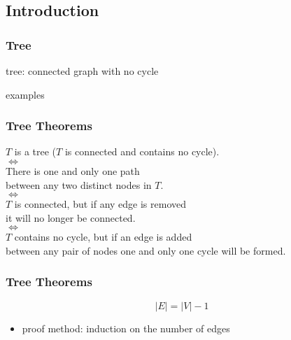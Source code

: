 \documentclass[dvipsnames]{beamer}
\begin{document}
\subsection{Introduction}

\begin{frame}
  \frametitle{Tree}

  \begin{definition}
    \alert{tree}: connected graph with no cycle
  \end{definition}

  \begin{exampleblock}{examples}
    \begin{center}
    \end{center}
  \end{exampleblock}
\end{frame}

\begin{frame}
  \frametitle{Tree Theorems}

  \begin{theorem}
    \begin{center}
      $T$ is a tree ($T$ is connected and contains no cycle).\\
      $\Leftrightarrow$\\
      There is one and only one path\\
        between any two distinct nodes in $T$.\\
      $\Leftrightarrow$\\
      $T$ is connected, but if any edge is removed\\
        it will no longer be connected.\\
      $\Leftrightarrow$\\
      $T$ contains no cycle, but if an edge is added\\
        between any pair of nodes one and only one cycle will be formed.
    \end{center}
  \end{theorem}
\end{frame}

\begin{frame}
  \frametitle{Tree Theorems}

  \begin{theorem}
    \[|E| = |V| - 1\]
  \end{theorem}

  \begin{itemize}
    \item proof method: induction on the number of edges
  \end{itemize}
\end{frame}
\end{document}
